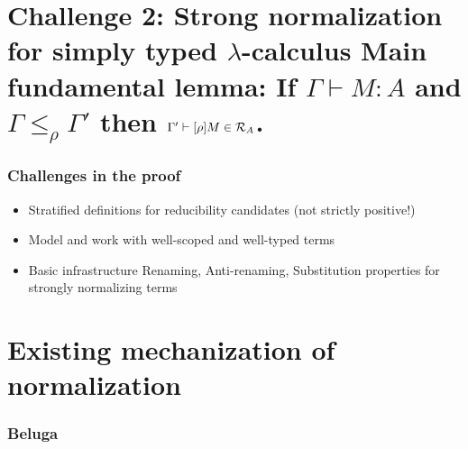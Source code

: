 \documentclass{beamer}
\begin{document}
\section{Challenge 2: Strong normalization  for simply typed
  $\lambda$-calculus \newline \newline
Main fundamental lemma: \newline If $\Gamma \vdash M : A$ and $\Gamma \leq_\rho
\Gamma'$ then $\Gamma' \vdash [\rho]M \in \mathcal{R}_A$. 
}


\begin{frame}
  \frametitle{Challenges in the proof}
\begin{itemize}
  \item Stratified definitions for reducibility candidates (not
    strictly positive!)
  \item Model and work with well-scoped and well-typed terms 
  \item Basic infrastructure
Renaming, Anti-renaming, Substitution properties for
      strongly normalizing terms 
\end{itemize}
\end{frame}



\section{Existing mechanization of normalization}


\begin{frame}
  \frametitle{Beluga}
  

\end{frame}
\end{document}
